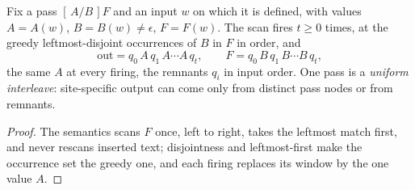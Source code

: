 \documentclass[runningheads,envcountsect]{llncs}
\begin{document}
\begin{lemma}
    \label{dich:lem:sweep}
    Fix a pass $[\,A/B\,]F$ and an input $w$ on which it is defined, with values $A = A(w)$, $B = B(w) \ne \epsilon$, $F = F(w)$. The scan fires $t \ge 0$ times, at the greedy leftmost-disjoint occurrences of $B$ in $F$ in order, and
    \begin{equation*}
        \mathrm{out} = q_0\,A\,q_1\,A\cdots A\,q_t, \qquad
        F = q_0\,B\,q_1\,B\cdots B\,q_t,
    \end{equation*}
    the same $A$ at every firing, the remnants $q_i$ in input order. One pass is a \emph{uniform interleave}: site-specific output can come only from distinct pass nodes or from remnants.
\end{lemma}

\begin{proof}
    The semantics scans $F$ once, left to right, takes the leftmost match first, and never rescans inserted text; disjointness and leftmost-first make the occurrence set the greedy one, and each firing replaces its window by the one value $A$.
\end{proof}
\end{document}
